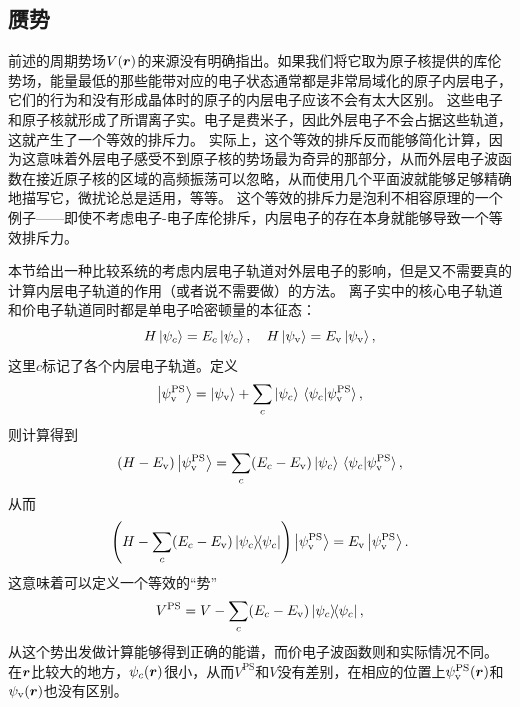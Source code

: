 \subsection{赝势}\label{sec:pseudopotential}

前述的周期势场$V(\vb*{r})$的来源没有明确指出。如果我们将它取为原子核提供的库伦势场，能量最低的那些能带对应的电子状态通常都是非常局域化的原子内层电子，它们的行为和没有形成晶体时的原子的内层电子应该不会有太大区别。
这些电子和原子核就形成了所谓离子实。电子是费米子，因此外层电子不会占据这些轨道，这就产生了一个等效的排斥力。
实际上，这个等效的排斥反而能够简化计算，因为这意味着外层电子感受不到原子核的势场最为奇异的那部分，从而外层电子波函数在接近原子核的区域的高频振荡可以忽略，从而使用几个平面波就能够足够精确地描写它，微扰论总是适用，等等。
这个等效的排斥力是泡利不相容原理的一个例子——即使不考虑电子-电子库伦排斥，内层电子的存在本身就能够导致一个等效排斥力。

本节给出一种比较系统的考虑内层电子轨道对外层电子的影响，但是又不需要真的计算内层电子轨道的作用（或者说不需要做）的方法。
离子实中的核心电子轨道和价电子轨道同时都是单电子哈密顿量的本征态：
\begin{equation}
    H \ket{\psi_c} = E_c \ket{\psi_c}, \quad H \ket{\psi_\text{v}} = E_\text{v} \ket{\psi_\text{v}},
\end{equation}
这里$c$标记了各个内层电子轨道。定义
\begin{equation}
    \ket{\psi_\text{v}^\text{PS}} = \ket{\psi_\text{v}} + \sum_c \ket{\psi_c} \braket*{\psi_c}{\psi_\text{v}^\text{PS}},
\end{equation}
则计算得到
\[
    (H - E_\text{v}) \ket{\psi_\text{v}^\text{PS}} = \sum_c (E_c - E_\text{v}) \ket{\psi_c} \braket*{\psi_c}{\psi_\text{v}^\text{PS}},
\]
从而
\begin{equation}
    \left(H - \sum_c (E_c - E_\text{v}) \dyad*{\psi_c}\right) \ket{\psi_\text{v}^\text{PS}} = E_\text{v} \ket{\psi_\text{v}^\text{PS}}.
    \label{eq:original-pseudopotential}
\end{equation}
这意味着可以定义一个等效的“势”
\begin{equation}
    V^\text{PS} = V - \sum_c (E_c - E_\text{v}) \dyad*{\psi_c},
\end{equation}
从这个势出发做计算能够得到正确的能谱，而价电子波函数则和实际情况不同。
在$\vb*{r}$比较大的地方，$\psi_c(\vb*{r})$很小，从而$V^\text{PS}$和$V$没有差别，在相应的位置上$\psi_\text{v}^\text{PS}(\vb*{r})$和$\psi_\text{v}(\vb*{r})$也没有区别。

